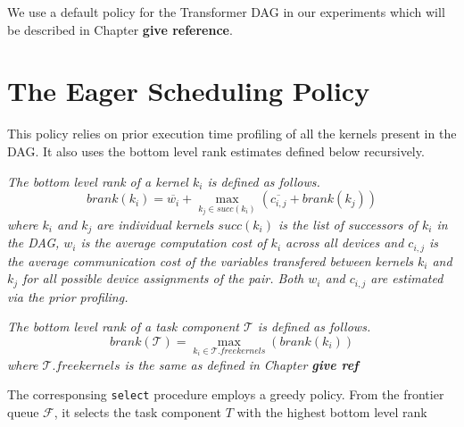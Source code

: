 We use a default policy for the Transformer DAG in our experiments which will be described in Chapter \textbf{give reference}.

\section{The Eager Scheduling Policy}
This policy relies on prior execution time profiling of all the kernels present in the DAG. It also uses the bottom level rank estimates defined below recursively. 

\begin{definition}
    \emph{The bottom level rank of a kernel $k_{i}$ is defined as follows.}
    \begin{equation}
        brank(k_{i}) = \overline{w_{i}} + \max_{k_{j} \in succ({k_{i}})}(\overline{c_{i,j}}+brank(k_{j}))
    \end{equation}
    \emph{where $k_{i}$ and $k_{j}$ are individual kernels $succ(k_{i})$ is the list of successors of $k_{i}$ in the DAG, $w_{i}$ is the average computation cost of $k_{i}$ across all devices and $c_{i,j}$ is the average communication cost of the variables transfered between kernels $k_{i}$ and $k_{j}$ for all possible device assignments of the pair. Both $w_{i}$ and $c_{i,j}$ are estimated via the prior profiling. }
\end{definition}

\begin{definition}
    \emph{The bottom level rank of a task component $\mathcal{T}$ is defined as follows.}
    \begin{equation}
        brank(\mathcal{T}) =  \max_{k_{i} \in \mathcal{T}.freekernels}(brank(k_{i}))
    \end{equation}
    \emph{where $\mathcal{T}.freekernels$ is the same as defined in Chapter \textbf{give ref}}
\end{definition}


The corresponsing {\tt select} procedure employs a greedy policy. From the frontier queue $\mathcal{F}$, it selects the task component $T$ with the highest bottom level rank
